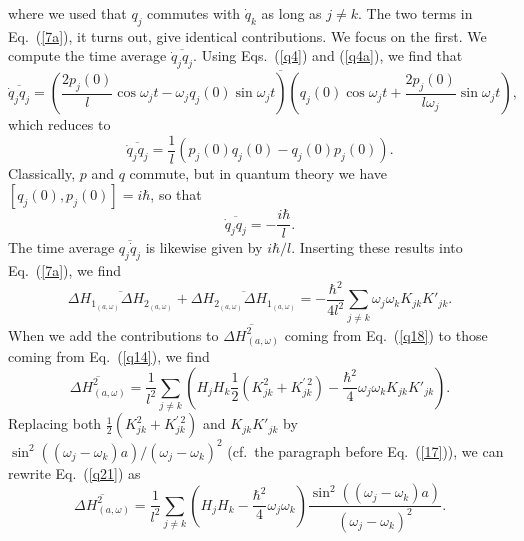 \documentclass{elsart}
\begin{document}
where we used that $q_j$ commutes with $\dot{q}_k$ as long as $j \neq k$. 
The two terms in Eq.\ (\ref{7a}), it turns out, give identical contributions. We focus on the first. We compute the time average $\overline{\dot{q}_j q_j}$. Using Eqs.\ (\ref{q4}) and (\ref{q4a}), we find that
$$
\overline{\dot{q}_j q_j} = \overline{\left(  \frac{2p_j(0)}{l}  \cos{ \omega_j t}  -  \omega_j q_j(0) \sin{ \omega_j t} \right) 
\left(  q_j(0) \cos{ \omega_j t}  +  \frac{2p_j(0)}{l \omega_j}  \sin{ \omega_j t} \right)},
$$
which reduces to
\begin{equation}
\overline{\dot{q}_j q_j} = \frac{1}{l} \left( p_j(0) q_j(0) - q_j(0) p_j(0)\right).
\label{q16}
\end{equation}
Classically, $p$ and $q$ commute, but in quantum theory we have $[q_j(0), p_j(0)] = i \hbar$, so that
\begin{equation}
\overline{\dot{q}_j q_j} = - \frac{i \hbar}{l}.
\label{q17}
\end{equation}
The time average $\overline{ q_j \dot{q}_j}$ is likewise given by $i \hbar/l$. Inserting these results into Eq.\ (\ref{7a}), we find
\begin{equation}
\overline{\Delta H_{1_{(a, \omega)}} \Delta H_{2_{(a, \omega)}}} + \overline{\Delta H_{2_{(a, \omega)}} \Delta H_{1_{(a, \omega)}}}
= - \frac{\hbar^2}{4l^2} \sum_{j \neq k} \omega_j \omega_k K_{jk} K'_{jk}.
\label{q18}
\end{equation}
When we add the contributions to $\overline{\Delta H_{(a, \omega)}^2}$ coming from Eq.\ (\ref{q18}) to those coming from Eq.\ (\ref{q14}), we find
\begin{equation}
\overline{\Delta H_{(a, \omega)}^2} =
\frac{1}{l^2}  \sum_{j \neq k} \left(  H_j H_k \frac{1}{2} \left( K^2_{jk} + K^{' \, 2}_{jk}\right) - 
\frac{\hbar^2}{4} \omega_j \omega_k K_{jk} K'_{jk} \right).
 \label{q21}
\end{equation}
Replacing both $ \frac{1}{2} \left( K^2_{jk} + K^{' \, 2}_{jk} \right)$ and $K_{jk} K'_{jk}$ by $\sin^2{((\omega_j - \omega_k)a)}/(\omega_j - \omega_k)^2$
(cf.\ the paragraph before Eq.\ (\ref{17})), we can rewrite Eq.\ (\ref{q21}) as 
\begin{equation}
\overline{\Delta H_{(a, \omega)}^2} =
\frac{1}{l^2}  \sum_{j \neq k} \left(  H_j H_k  - 
\frac{\hbar^2}{4} \omega_j \omega_k  \right)   \frac{\sin^2{((\omega_j - \omega_k)a)}}{(\omega_j - \omega_k)^2}.
 \label{q30}
 \end{equation}
\end{document}

